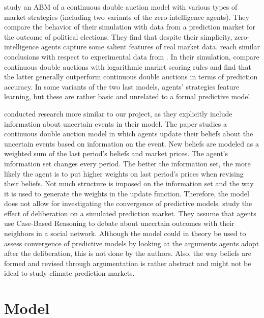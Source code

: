 \documentclass{sig-alternate}
\begin{document}
	\cite{Tseng2010a} study an ABM of a continuous double auction model with various types of market strategies (including two variants of the zero-intelligence agents). They compare the behavior of their simulation with data from a prediction market for the outcome of political elections. They find that despite their simplicity, zero-intelligence agents capture some salient features of real market data. \cite{Klingert2012c} reach similar conclusions with respect to experimental data from  \cite{Hanson2006}. In their simulation, \cite{Klingert2012c} compare continuous double auctions with logarithmic market scoring rules and find that the latter generally outperform continuous double auctions in terms of prediction accuracy. In some variants of the two last models, agents' strategies feature learning, but these are rather basic and unrelated to a formal predictive model. 
	
	\cite{Jumadinova2011a} conducted research more similar to our project, as they explicitly include information about uncertain events in their model. The paper studies a continuous double auction model in which agents update their beliefs about the uncertain events based on information on the event. New beliefs are modeled as a weighted sum of the last period's beliefs and market prices. The agent's information set changes every period. The better the information set, the more likely the agent is to put higher weights on last period's prices when revising their beliefs. Not much structure is imposed on the information set and the way it is used to generate the weights in the update function. Therefore, the model does not allow for investigating the convergence of predictive models. \cite{Ontanon2009} study the effect of deliberation on a simulated prediction market. They assume that agents use Case-Based Reasoning \citep{Aamodt1994} to debate about  uncertain outcomes with their neighbors in a social network.  Although the model could in theory be used to assess convergence of predictive models by looking at the arguments agents adopt after the deliberation, this is not done by the authors. Also, the way beliefs are formed and revised through argumentation is rather abstract and might not be ideal to study climate prediction markets.
 
	
	\section{Model}
	
	\label{model}
	
\end{document}
